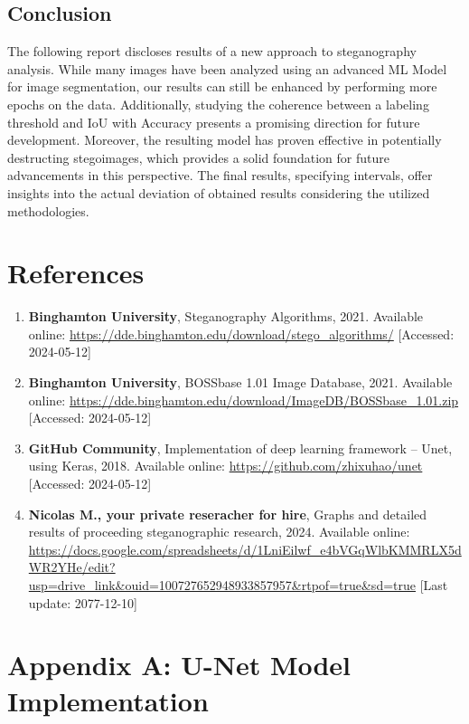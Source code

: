 \documentclass[12pt,a4paper]{article}
\begin{document}
\subsection{Conclusion}
The following report discloses results of a new approach to steganography analysis. While many images have been analyzed using an advanced ML Model for image segmentation, our results can still be enhanced by performing more epochs on the data. Additionally, studying the coherence between a labeling threshold and IoU with Accuracy presents a promising direction for future development. Moreover, the resulting model has proven effective in potentially destructing stegoimages, which provides a solid foundation for future advancements in this perspective. The final results, specifying intervals, offer insights into the actual deviation of obtained results considering the utilized methodologies.

\section*{References}
\begin{enumerate}
    \item \textbf{Binghamton University}, Steganography Algorithms, 2021. Available online: \url{https://dde.binghamton.edu/download/stego_algorithms/} [Accessed: 2024-05-12]
    \item \textbf{Binghamton University}, BOSSbase 1.01 Image Database, 2021. Available online: \url{https://dde.binghamton.edu/download/ImageDB/BOSSbase_1.01.zip} [Accessed: 2024-05-12]
    \item \textbf{GitHub Community}, Implementation of deep learning framework -- Unet, using Keras, 2018. Available online: \url{https://github.com/zhixuhao/unet} [Accessed: 2024-05-12]
    \item \textbf{Nicolas M., your private reseracher for hire}, Graphs and detailed results of proceeding steganographic research, 2024. Available online: \url{https://docs.google.com/spreadsheets/d/1LniEilwf_e4bVGqWlbKMMRLX5dWR2YHe/edit?usp=drive_link&ouid=100727652948933857957&rtpof=true&sd=true} [Last update: 2077-12-10]
\end{enumerate}

\newpage  %
\section*{Appendix A: U-Net Model Implementation}
\end{document}
